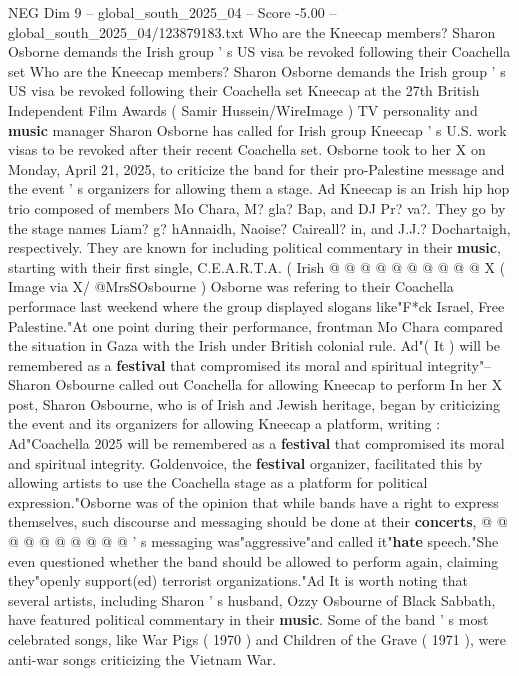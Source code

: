 \begin{textsample}{NEG Dim 9 – global\_south\_2025\_04 – Score -5.00 – global\_south\_2025\_04/123879183.txt}  \label{ex:f9_neg_295}
Who are the Kneecap members?
Sharon Osborne demands the Irish group ' s US visa be revoked following their Coachella set Who are the Kneecap members?
Sharon Osborne demands the Irish group ' s US visa be revoked following their Coachella set Kneecap at the 27th British Independent Film Awards ( Samir Hussein/WireImage ) TV personality and \textbf{music} manager Sharon Osborne has called for Irish group Kneecap ' s U.S. work visas to be revoked after their recent Coachella set.
Osborne took to her X on Monday, April 21, 2025, to criticize the band for their pro-Palestine message and the event ' s organizers for allowing them a stage.
Ad Kneecap is an Irish hip hop trio composed of members Mo Chara, M? gla?
Bap, and DJ Pr? va?.
They go by the stage names Liam? g? hAnnaidh, Naoise?
Caireall? in, and J.J.?
Dochartaigh, respectively.
They are known for including political commentary in their \textbf{music}, starting with their first single, C.E.A.R.T.A. ( Irish @ @ @ @ @ @ @ @ @ @ X ( Image via X/ @MrsSOsbourne ) Osborne was refering to their Coachella performace last weekend where the group displayed slogans like"F*ck Israel, Free Palestine."At one point during their performance, frontman Mo Chara compared the situation in Gaza with the Irish under British colonial rule.
Ad"( It ) will be remembered as a \textbf{festival} that compromised its moral and spiritual integrity"-- Sharon Osbourne called out Coachella for allowing Kneecap to perform In her X post, Sharon Osbourne, who is of Irish and Jewish heritage, began by criticizing the event and its organizers for allowing Kneecap a platform, writing : Ad"Coachella 2025 will be remembered as a \textbf{festival} that compromised its moral and spiritual integrity.
Goldenvoice, the \textbf{festival} organizer, facilitated this by allowing artists to use the Coachella stage as a platform for political expression."Osborne was of the opinion that while bands have a right to express themselves, such discourse and messaging should be done at their \textbf{concerts}, @ @ @ @ @ @ @ @ @ @ ' s messaging was"aggressive"and called it"\textbf{hate} speech."She even questioned whether the band should be allowed to perform again, claiming they"openly support(ed) terrorist organizations."Ad It is worth noting that several artists, including Sharon ' s husband, Ozzy Osbourne of Black Sabbath, have featured political commentary in their \textbf{music}.
Some of the band ' s most celebrated songs, like War Pigs ( 1970 ) and Children of the Grave ( 1971 ), were anti-war songs criticizing the Vietnam War.

\end{textsample}
